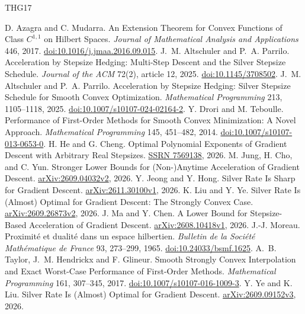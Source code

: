 \documentclass[11pt]{article}
\theoremstyle{definition}
\begin{document}
\begin{thebibliography}{THG17}
\small
\raggedright
\setlength{\itemsep}{.25em}
D. Azagra and C. Mudarra.
An Extension Theorem for Convex Functions of Class $C^{1,1}$ on Hilbert Spaces.
\emph{Journal of Mathematical Analysis and Applications} 446, 2017.
\href{https://doi.org/10.1016/j.jmaa.2016.09.015}{doi:10.1016/j.jmaa.2016.09.015}.
J.~M. Altschuler and P.~A. Parrilo.
Acceleration by Stepsize Hedging: Multi-Step Descent and the Silver Stepsize Schedule.
\emph{Journal of the ACM} 72(2), article 12, 2025.
\href{https://doi.org/10.1145/3708502}{doi:10.1145/3708502}.
J.~M. Altschuler and P.~A. Parrilo.
Acceleration by Stepsize Hedging: Silver Stepsize Schedule for Smooth Convex Optimization.
\emph{Mathematical Programming} 213, 1105--1118, 2025.
\href{https://doi.org/10.1007/s10107-024-02164-2}{doi:10.1007/s10107-024-02164-2}.
Y. Drori and M. Teboulle.
Performance of First-Order Methods for Smooth Convex Minimization: A Novel Approach.
\emph{Mathematical Programming} 145, 451--482, 2014.
\href{https://doi.org/10.1007/s10107-013-0653-0}{doi:10.1007/s10107-013-0653-0}.
H. He and G. Cheng.
Optimal Polynomial Exponents of Gradient Descent with Arbitrary Real Stepsizes.
\href{https://ssrn.com/abstract=7569138}{SSRN 7569138}, 2026.
M. Jung, H. Cho, and C. Yun.
Stronger Lower Bounds for (Non-)Anytime Acceleration of Gradient Descent.
\href{https://arxiv.org/abs/2609.04032v2}{arXiv:2609.04032v2}, 2026.
Y. Jeong and Y. Hong.
Silver Rate Is Sharp for Gradient Descent.
\href{https://arxiv.org/abs/2611.30100v1}{arXiv:2611.30100v1}, 2026.
K. Liu and Y. Ye.
Silver Rate Is (Almost) Optimal for Gradient Descent: The Strongly Convex Case.
\href{https://arxiv.org/abs/2609.26873v2}{arXiv:2609.26873v2}, 2026.
J. Ma and Y. Chen.
A Lower Bound for Stepsize-Based Acceleration of Gradient Descent.
\href{https://arxiv.org/abs/2608.10418v1}{arXiv:2608.10418v1}, 2026.
J.-J. Moreau.
Proximit\'e et dualit\'e dans un espace hilbertien.
\emph{Bulletin de la Soci\'et\'e Math\'ematique de France} 93, 273--299, 1965.
\href{https://doi.org/10.24033/bsmf.1625}{doi:10.24033/bsmf.1625}.
A.~B. Taylor, J.~M. Hendrickx and F. Glineur.
Smooth Strongly Convex Interpolation and Exact Worst-Case Performance of First-Order Methods.
\emph{Mathematical Programming} 161, 307--345, 2017.
\href{https://doi.org/10.1007/s10107-016-1009-3}{doi:10.1007/s10107-016-1009-3}.
Y. Ye and K. Liu.
Silver Rate Is (Almost) Optimal for Gradient Descent.
\href{https://arxiv.org/abs/2609.09152v3}{arXiv:2609.09152v3}, 2026.
\end{thebibliography}
\end{document}

